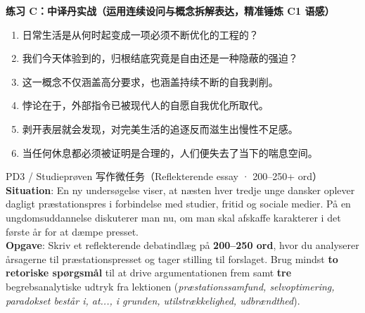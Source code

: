 \textbf{练习 C：中译丹实战（运用连续设问与概念拆解表达，精准锤炼 C1 语感）}
\begin{enumerate}
  \item 日常生活是从何时起变成一项必须不断优化的工程的？
  \item 我们今天体验到的，归根结底究竟是自由还是一种隐蔽的强迫？
  \item 这一概念不仅涵盖高分要求，也涵盖持续不断的自我剥削。
  \item 悖论在于，外部指令已被现代人的自愿自我优化所取代。
  \item 剥开表层就会发现，对完美生活的追逐反而滋生出慢性不足感。
  \item 当任何休息都必须被证明是合理的，人们便失去了当下的喘息空间。
\end{enumerate}


\begin{emailbox}{PD3 / Studieprøven 写作微任务（Reflekterende essay · 200--250+ ord）}
\textbf{Situation}: En ny undersøgelse viser, at næsten hver tredje unge dansker oplever dagligt præstationspres i forbindelse med studier, fritid og sociale medier. På en ungdomsuddannelse diskuterer man nu, om man skal afskaffe karakterer i det første år for at dæmpe presset.\\[3pt]
\textbf{Opgave}: Skriv et reflekterende debatindlæg på \textbf{200--250 ord}, hvor du analyserer årsagerne til præstationspresset og tager stilling til forslaget. Brug mindst \textbf{to retoriske spørgsmål} til at drive argumentationen frem samt \textbf{tre} begrebsanalytiske udtryk fra lektionen (\textit{præstationssamfund, selvoptimering, paradokset består i, at..., i grunden, utilstrækkelighed, udbrændthed}).
\end{emailbox}

